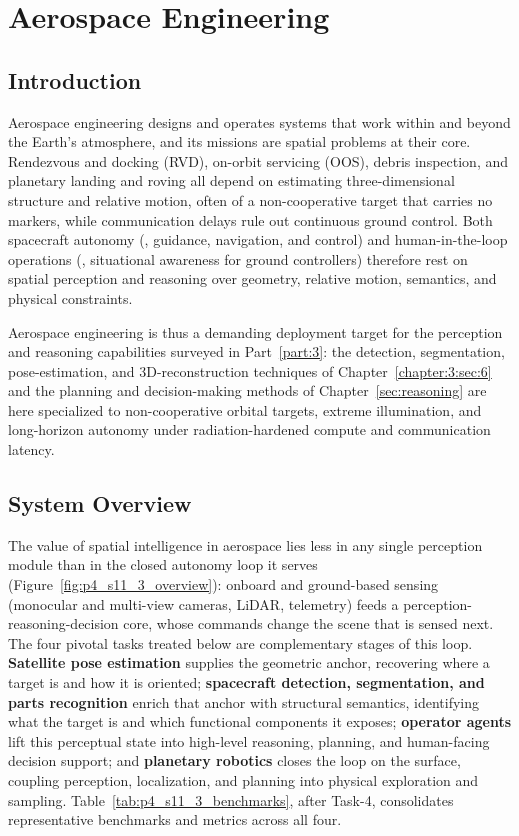 \section{Aerospace Engineering}
\label{sec:p4_s11_3}

\subsection{Introduction}
\label{subsec:p4-sec11-3-introduction}

Aerospace engineering designs and operates systems that work within and beyond the Earth's atmosphere, and its missions are spatial problems at their core.
Rendezvous and docking (RVD), on-orbit servicing (OOS), debris inspection, and planetary landing and roving all depend on estimating three-dimensional structure and relative motion, often of a non-cooperative target that carries no markers, while communication delays rule out continuous ground control.
Both spacecraft autonomy (\eg, guidance, navigation, and control) and human-in-the-loop operations (\eg, situational awareness for ground controllers) therefore rest on spatial perception and reasoning over geometry, relative motion, semantics, and physical constraints.

Aerospace engineering is thus a demanding deployment target for the perception and reasoning capabilities surveyed in Part~\ref{part:3}: the detection, segmentation, pose-estimation, and 3D-reconstruction techniques of Chapter~\ref{chapter:3:sec:6} and the planning and decision-making methods of Chapter~\ref{sec:reasoning} are here specialized to non-cooperative orbital targets, extreme illumination, and long-horizon autonomy under radiation-hardened compute and communication latency.

\subsection{System Overview}
\label{subsec:p4-sec11-3-system-overview}
The value of spatial intelligence in aerospace lies less in any single perception module than in the closed autonomy loop it serves (Figure~\ref{fig:p4_s11_3_overview}): onboard and ground-based sensing (monocular and multi-view cameras, LiDAR, telemetry) feeds a perception-reasoning-decision core, whose commands change the scene that is sensed next.
The four pivotal tasks treated below are complementary stages of this loop.
\textbf{Satellite pose estimation} supplies the geometric anchor, recovering where a target is and how it is oriented;
\textbf{spacecraft detection, segmentation, and parts recognition} enrich that anchor with structural semantics, identifying what the target is and which functional components it exposes;
\textbf{operator agents} lift this perceptual state into high-level reasoning, planning, and human-facing decision support; and
\textbf{planetary robotics} closes the loop on the surface, coupling perception, localization, and planning into physical exploration and sampling.
Table~\ref{tab:p4_s11_3_benchmarks}, after Task-4, consolidates representative benchmarks and metrics across all four.

